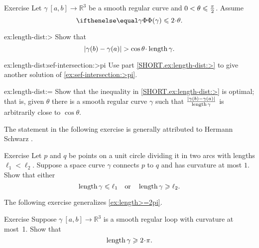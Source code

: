 \begin{thm}{Exercise}\label{ex:length-dist}
Let $\gamma\:[a,b]\to \mathbb{R}^3$ be a smooth regular curve and $0\z<\theta\z\le\tfrac\pi2$.
Assume 
\[\tc\gamma\le 2\cdot\theta.\]

\begin{subthm}{ex:length-dist:>} Show that
\[|\gamma(b)-\gamma(a)|> \cos\theta\cdot\length\gamma.\]
\end{subthm}

\begin{subthm}{ex:length-dist:sef-intersection:>pi} Use part \ref{SHORT.ex:length-dist:>} to give another solution of \ref{ex:sef-intersection:>pi}.
\end{subthm}

\begin{subthm}{ex:length-dist:=} Show that the inequality in \ref{SHORT.ex:length-dist:>} is optimal; that is, given 
$\theta$ there is a smooth regular curve $\gamma$ such that $\frac{|\gamma(b)-\gamma(a)|}{\mathop{\rm length}\nolimits\gamma}$ is arbitrarily close to $\cos\theta$.
\end{subthm}

\end{thm}

The statement in the following exercise is generally attributed to Hermann Schwarz \cite{shur}.

\begin{thm}{Exercise}\label{ex:schwartz}
Let $p$ and $q$ be points on a unit circle dividing it in two arcs with lengths $\ell_1<\ell_2$.
Suppose a space curve $\gamma$ connects $p$ to $q$ and has curvature at most $1$.
Show that either
\[\mathop{\rm length}\nolimits \gamma\leqslant \ell_1
\quad\text{or}\quad
\mathop{\rm length}\nolimits \gamma\geqslant \ell_2.
\]
\end{thm}

The following exercise generalizes \ref{ex:length>=2pi}.

\begin{thm}{Exercise}\label{ex:loop}
Suppose $\gamma\:[a,b]\to \mathbb{R}^3$ is a smooth regular loop with curvature at most~1.
Show that 
\[\length\gamma\ge2\cdot\pi.\]

\end{thm}


